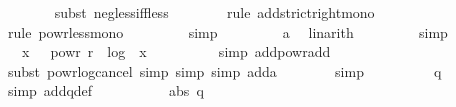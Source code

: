 \begin{isabellebody}
\ \ \ \ \ \ \isamarkupfalse%
\ {\isacharparenleft}{\kern0pt}subst\ neg{\isacharunderscore}{\kern0pt}less{\isacharunderscore}{\kern0pt}iff{\isacharunderscore}{\kern0pt}less{\isacharparenright}{\kern0pt}\isanewline
\ \ \ \ \ \ \isamarkupfalse%
\ {\isacharparenleft}{\kern0pt}rule\ add{\isacharunderscore}{\kern0pt}strict{\isacharunderscore}{\kern0pt}right{\isacharunderscore}{\kern0pt}mono{\isacharparenright}{\kern0pt}\isanewline
\ \ \ \ \ \ \isamarkupfalse%
\ {\isacharparenleft}{\kern0pt}rule\ powr{\isacharunderscore}{\kern0pt}less{\isacharunderscore}{\kern0pt}mono{\isacharparenright}{\kern0pt}\isanewline
\ \ \ \ \ \ \ \isamarkupfalse%
\ {\isacharparenleft}{\kern0pt}simp{\isacharparenright}{\kern0pt}\isanewline
\ \ \ \ \ \ \ \isamarkupfalse%
\ a\ \isamarkupfalse%
\ linarith\isanewline
\ \ \ \ \ \ \ \isamarkupfalse%
\ simp{\isacharplus}{\kern0pt}\isanewline
\ \ \ \ \isamarkupfalse%
\ \isamarkupfalse%
\ {\isachardoublequoteopen}{\isachardot}{\kern0pt}{\isachardot}{\kern0pt}{\isachardot}{\kern0pt}\ {\isacharequal}{\kern0pt}\ x\ {\isacharasterisk}{\kern0pt}\ {}\ powr\ {\isacharparenleft}{\kern0pt}r\ {\isacharminus}{\kern0pt}\ {\isasymlfloor}log\ {}\ {\isasymbar}x{\isasymbar}{\isasymrfloor}{\isacharparenright}{\kern0pt}\ {\isacharminus}{\kern0pt}\ {}{\isachardoublequoteclose}\isanewline
\ \ \ \ \ \ \isamarkupfalse%
\ {\isacharparenleft}{\kern0pt}simp\ add{\isacharcolon}{\kern0pt}powr{\isacharunderscore}{\kern0pt}add{\isacharparenright}{\kern0pt}\isanewline
\ \ \ \ \ \ \isamarkupfalse%
\ {\isacharparenleft}{\kern0pt}subst\ powr{\isacharunderscore}{\kern0pt}log{\isacharunderscore}{\kern0pt}cancel{\isacharcomma}{\kern0pt}\ simp{\isacharcomma}{\kern0pt}\ simp{\isacharcomma}{\kern0pt}\ simp\ add{\isacharcolon}{\kern0pt}a{\isacharparenright}{\kern0pt}\isanewline
\ \ \ \ \ \ \isamarkupfalse%
\ simp\isanewline
\ \ \ \ \isamarkupfalse%
\ \isamarkupfalse%
\ {\isachardoublequoteopen}{\isachardot}{\kern0pt}{\isachardot}{\kern0pt}{\isachardot}{\kern0pt}\ {\isasymle}\ q{\isachardoublequoteclose}\isanewline
\ \ \ \ \ \ \isamarkupfalse%
\ {\isacharparenleft}{\kern0pt}simp\ add{\isacharcolon}{\kern0pt}q{\isacharunderscore}{\kern0pt}def{\isacharparenright}{\kern0pt}\isanewline
\ \ \ \ \isamarkupfalse%
\ \isamarkupfalse%
\ {\isachardoublequoteopen}{\isachardot}{\kern0pt}{\isachardot}{\kern0pt}{\isachardot}{\kern0pt}\ {\isacharequal}{\kern0pt}\ {\isacharminus}{\kern0pt}\ abs\ q{\isachardoublequoteclose}\isanewline

\end{isabellebody}
